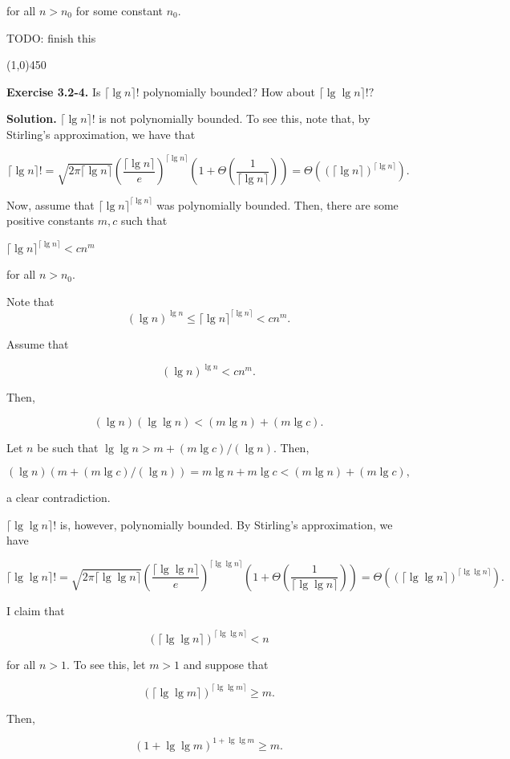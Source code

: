 \documentclass{article}
\newcommand{\exec}[2]
{\textbf{Exercise #1.} #2

\textbf{Solution.}}
\newcommand{\bardiv}{\begin{center}
\line(1,0){450}
\end{center}}
\begin{document}
for all $n > n_0$ for some constant $n_0.$

TODO: finish this

\bardiv

\exec{3.2-4}{Is $\lceil \lg n\rceil !$ polynomially bounded? How about $\lceil \lg \lg n\rceil !?$}
$\lceil \lg n\rceil !$ is not polynomially bounded. To see this, note that, by Stirling's approximation, we have that

$$\lceil \lg n\rceil ! = \sqrt{2\pi \lceil \lg n\rceil} \left(\frac{\lceil \lg n\rceil}{e}\right)^{\lceil \lg n\rceil}\left(1+\Theta\left(\frac{1}{\lceil \lg n\rceil}\right)\right) = \Theta((\lceil \lg n \rceil)^{\lceil \lg n\rceil}).$$

Now, assume that $\lceil \lg n\rceil^{\lceil \lg n\rceil}$ was polynomially bounded. Then, there are some positive constants $m, c$ such that 

$\lceil \lg n\rceil^{\lceil \lg n\rceil} < cn^m$

for all $n > n_0.$

Note that $$(\lg n)^{\lg n} \leq \lceil \lg n\rceil^{\lceil \lg n\rceil} < cn^m.$$

Assume that

$$(\lg n)^{\lg n} < cn^m.$$

Then, 

$$(\lg n)(\lg \lg n) < (m \lg n) + (m \lg c).$$

Let $n$ be such that $\lg \lg n > m + (m\lg c)/(\lg n).$ Then,

$$(\lg n)(m + (m\lg c)/(\lg n)) = m\lg n + m \lg c < (m\lg n) + (m\lg c),$$

a clear contradiction.

$\lceil \lg \lg n\rceil!$ is, however, polynomially bounded. By Stirling's approximation, we have

$$\lceil \lg \lg n\rceil! = \sqrt{2\pi \lceil \lg \lg n\rceil} \left(\frac{\lceil \lg \lg n\rceil}{e}\right)^{\lceil \lg \lg n\rceil}\left(1+\Theta\left(\frac{1}{\lceil \lg \lg n\rceil}\right)\right) = \Theta((\lceil \lg\lg n \rceil)^{\lceil \lg \lg n\rceil}).$$

I claim that

$$(\lceil \lg\lg n\rceil)^{\lceil \lg\lg n\rceil} < n$$

for all $n > 1.$ To see this, let $m > 1$ and suppose that 

$$(\lceil \lg\lg m\rceil)^{\lceil \lg\lg m\rceil} \geq m.$$

Then,

$$(1 + \lg\lg m)^{1 + \lg\lg m} \geq m.$$
\end{document}
